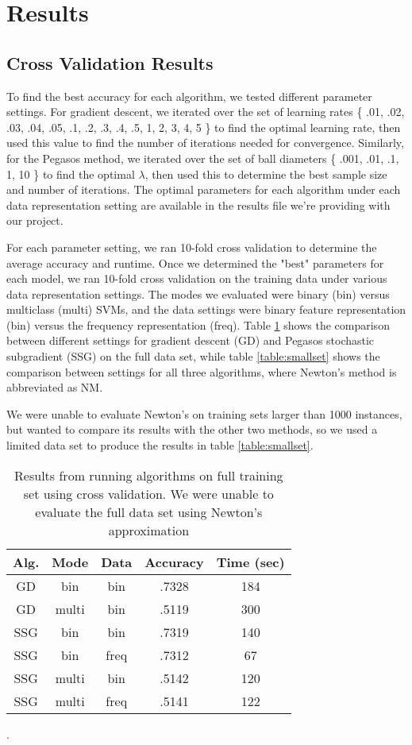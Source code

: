 \documentclass[letterpaper, 11pt]{article}
\begin{document}
\section{Results}

\subsection{Cross Validation Results}

To find the best accuracy for each algorithm, we tested different parameter settings.  For gradient descent, we iterated over the set of learning rates \{ .01, .02, .03, .04, .05, .1, .2, .3, .4, .5, 1, 2, 3, 4, 5  \} to find the optimal learning rate, then used this value to find the number of iterations needed for convergence.  Similarly, for the Pegasos method, we iterated over the set of ball diameters \{ .001, .01, .1, 1, 10 \} to find the optimal $\lambda$, then used this to determine the best sample size and number of iterations.  The optimal parameters for each algorithm under each data representation setting are available in the results file we're providing with our project.

For each parameter setting, we ran 10-fold cross validation to determine the average accuracy and runtime.  Once we determined the "best" parameters for each model, we ran 10-fold cross validation on the training data under various data representation settings.  The modes we evaluated were binary (bin) versus multiclass (multi) SVMs, and the data settings were binary feature representation (bin) versus the frequency representation (freq).  Table \ref{table:fullset} shows the comparison between different settings for gradient descent (GD) and Pegasos stochastic subgradient (SSG) on the full data set, while table \ref{table:smallset} shows the comparison between settings for all three algorithms, where Newton's method is abbreviated as NM. 

We were unable to evaluate Newton's on training sets larger than 1000 instances, but wanted to compare its results with the other two methods, so we used a limited data set to produce the results in table \ref{table:smallset}.

\begin{table}

\centering
\begin{tabular}{c|cccc}
\textbf{Alg.} & \textbf{Mode} & \textbf{Data} & \textbf{Accuracy} & \textbf{Time (sec)}\\
\hline
GD & bin & bin & .7328 & 184 \\
GD & multi & bin & .5119 & 300 \\
SSG & bin & bin & .7319 & 140 \\
SSG & bin & freq & .7312 & 67 \\
SSG & multi & bin & .5142 & 120 \\
SSG & multi & freq & .5141 & 122 \\
\end{tabular}
\caption{Results from running algorithms on full training set using cross validation.  We were unable to evaluate the full data set using Newton's approximation}\label{table:fullset}.
\end{table}
\end{document}

